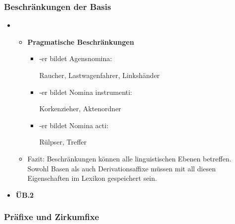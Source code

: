 \begin{frame}
\frametitle{Beschränkungen der Basis}

\begin{itemize}
\item[]

	\begin{itemize}
	
		\item \textbf{Pragmatische Beschränkungen}
	
		\begin{itemize}
			\item -er bildet Agensnomina: 
		
			\ea Raucher, Lastwagenfahrer, Linkshänder
			\z
			
			\item -er bildet Nomina instrumenti: 
		
			\ea Korkenzieher, Aktenordner
			\z
			
			\item -er bildet Nomina acti: 
		
			\ea Rülpser, Treffer
			\z
			
		\end{itemize}
		
		\item Fazit: Beschränkungen können alle linguistischen Ebenen betreffen. Sowohl Basen als auch Derivationsaffixe müssen mit all diesen Eigenschaften im Lexikon gespeichert sein.
	
	\end{itemize}

\item \textbf{ÜB.2}	
\end{itemize}

\end{frame}



\subsubsection{Präfixe und Zirkumfixe}


